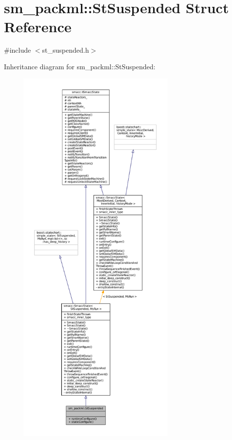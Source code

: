\hypertarget{structsm__packml_1_1StSuspended}{}\section{sm\+\_\+packml\+:\+:St\+Suspended Struct Reference}
\label{structsm__packml_1_1StSuspended}


{\ttfamily \#include $<$st\+\_\+suspended.\+h$>$}



Inheritance diagram for sm\+\_\+packml\+:\+:St\+Suspended\+:
\nopagebreak
\begin{figure}[H]
\begin{center}
\leavevmode
\includegraphics[height=550pt]{structsm__packml_1_1StSuspended__inherit__graph}
\end{center}
\end{figure}



